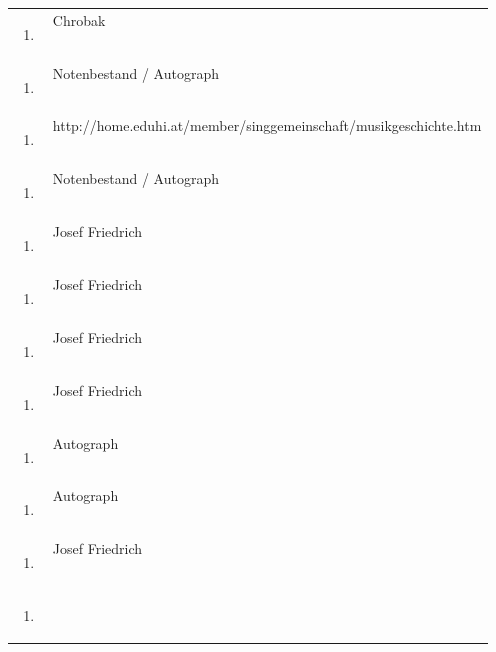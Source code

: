 \documentclass[a4paper]{article}
\begin{document}
\begin{flushleft}
\begin{supertabular}{m{1.2409999cm}m{14.604cm}}
\begin{enumerate}
\item 
\end{enumerate}
 &
Chrobak\\
\begin{enumerate}
\item 
\end{enumerate}
 &
Notenbestand / Autograph\\
\begin{enumerate}
\item 
\end{enumerate}
 &
http://home.eduhi.at/member/singgemeinschaft/musikgeschichte.htm\\
\begin{enumerate}
\item 
\end{enumerate}
 &
Notenbestand / Autograph\\
\begin{enumerate}
\item 
\end{enumerate}
 &
Josef Friedrich\\
\begin{enumerate}
\item 
\end{enumerate}
 &
Josef Friedrich\\
\begin{enumerate}
\item 
\end{enumerate}
 &
Josef Friedrich\\
\begin{enumerate}
\item 
\end{enumerate}
 &
Josef Friedrich\\
\begin{enumerate}
\item 
\end{enumerate}
 &
Autograph\\
\begin{enumerate}
\item 
\end{enumerate}
 &
Autograph\\
\begin{enumerate}
\item 
\end{enumerate}
 &
Josef Friedrich\\
\begin{enumerate}
\item 
\end{enumerate}

\end{supertabular}
\end{flushleft}
\end{document}
